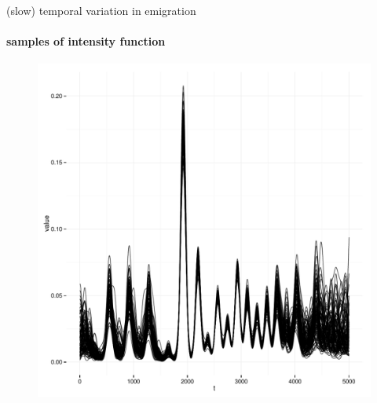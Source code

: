 \documentclass[show notes]{beamer}
\begin{document}
\begin{frame}{(slow) temporal variation in emigration}
  \framesubtitle{samples of intensity function}

	\begin{figure}
	\includegraphics[clip, trim=0 0 0 200, width=\textwidth]{local-model.pdf}
  	\end{figure}
  
\end{frame}
\end{document}
